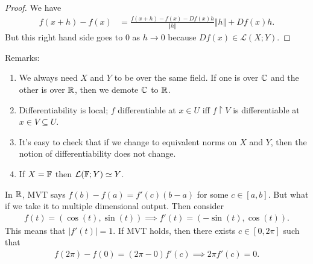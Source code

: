 \documentclass{report}
\begin{document}
\begin{proof}
    We have 
    \begin{align*}
        f(x + h) - f(x) &= \frac{f(x + h) - f(x) - Df(x) h}{\Vert h \Vert} \Vert h \Vert + Df(x) h.
    \end{align*}
    But this right hand side goes to 0 as $h \to 0$ because $Df(x) \in \mathcal L(X; Y)$.
\end{proof}
\noindent Remarks:
\begin{enumerate}
    \item We always need $X$ and $Y$ to be over the same field. If one is over $\CC$ and the other is over $\RR$, then we demote $\CC$ to $\RR$.
    \item Differentiability is local; $f$ differentiable at $x \in U$ iff $f \restriction V$ is differentiable at $x \in V \subseteq U$.
    \item It's easy to check that if we change to equivalent norms on $X$ and $Y$, then the notion of differentiability does not change.
    \item If $X = \FF$ then $\mathcal L(\FF; Y) \simeq Y$.
\end{enumerate}
In $\RR$, MVT says $f(b) - f(a) = f'(c)(b-a)$ for some $c \in [a,b]$. But what if we take it to multiple dimensional output. Then consider 
\begin{align*}
    f(t) = (\cos(t), \sin(t)) \implies f'(t) = (-\sin(t), \cos(t)).
\end{align*}
This means that $|f'(t)| = 1$. If MVT holds, then there exists $c \in [0, 2\pi]$ such that 
\begin{align*}
    f(2\pi) - f(0) = (2\pi - 0) f'(c) \implies 2\pi f'(c) = 0.
\end{align*}
\end{document}
